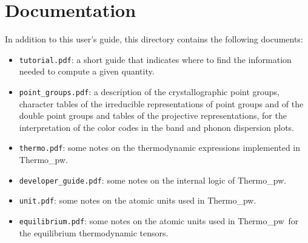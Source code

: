 \documentclass[12pt,a4paper,twoside]{report}
\def\thermo{{\sc Thermo\_pw}}
\begin{document}
\newpage
{\color{dark-blue}\chapter{Documentation}}
\color{black}

In addition to this user's guide, this directory contains the following
documents:

\begin{itemize}

\item
\texttt{tutorial.pdf}: a short guide that indicates where to find the
information needed to compute a given quantity. 

\item
\texttt{point\_groups.pdf}: a description of the crystallographic point 
groups, character tables of the irreducible representations of point
groups and of the double point groups and tables of the projective 
representations, for the interpretation of the color codes in the band 
and phonon dispersion plots.

\item
\texttt{thermo.pdf}: some notes on the thermodynamic expressions implemented
in \thermo.

\item
\texttt{developer\_guide.pdf}: some notes on the internal logic of
\thermo.

\item
\texttt{unit.pdf}: some notes on the atomic units used in 
\thermo.

\item
\texttt{equilibrium.pdf}: some notes on the atomic units used in 
\thermo\ for the equilibrium thermodynamic tensors.

\end{itemize}
\end{document}
